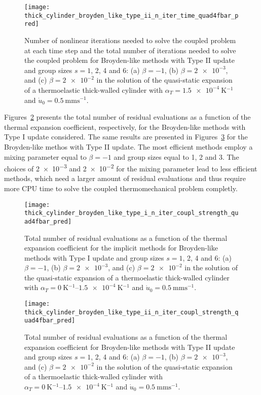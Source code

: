 \begin{figure}[htbp]
  \centering
  \texttt{[image: thick\_cylinder\_broyden\_like\_type\_ii\_n\_iter\_time\_quad4fbar\_pred]}
  \caption{Number of nonlinear iterations needed to solve the coupled problem at each time step and the total number of iterations needed to solve the coupled problem for Broyden-like methods with Type II update and group sizes \(s=1\), 2, 4 and 6: (a) \(\beta=-1\), (b) \(\beta=\num{2e-3}\), and (c) \(\beta=\num{2e-2}\) in the solution of the quasi-static expansion of a thermoelastic thick-walled cylinder with \(\alpha_T=\SI{1.5e-4}{\kelvin^{-1}}\) and \(\dot u_0 =\SI{0.5}{\milli\meter\second^{-1}}\).}
\label{fig:thick_cylinder_broyden_like_type_ii_n_iter_time_quad4fbar_pred}
\end{figure}

Figures~\ref{fig:thick_cylinder_broyden_like_type_i_n_iter_coupl_strength_quad4fbar_pred} presents the total number of residual evaluations as a function of the thermal expansion coefficient, respectively, for the Broyden-like methods with Type I update considered.
The same results are presented in Figures~\ref{fig:thick_cylinder_broyden_like_type_ii_n_iter_coupl_strength_quad4fbar_pred} for the Broyden-like methos with Type II update.
The most efficient methods employ a mixing parameter equal to \(\beta=-1\) and group sizes equal to 1, 2 and 3.
The choices of \num{2e-3} and \num{2e-2} for the mixing parameter lead to less efficient methods, which need a larger amount of residual evaluations and thus require more CPU time to solve the coupled thermomechanical problem completly.

\begin{figure}[htbp]
  \centering
  \texttt{[image: thick\_cylinder\_broyden\_like\_type\_i\_n\_iter\_coupl\_strength\_quad4fbar\_pred]}
  \caption{Total number of residual evaluations as a function of the thermal expansion coefficient for the implicit methods for Broyden-like methods with Type I update and group sizes \(s=1\), 2, 4 and 6: (a) \(\beta=-1\), (b) \(\beta=\num{2e-3}\), and (c) \(\beta=\num{2e-2}\) in the solution of the quasi-static expansion of a thermoelastic thick-walled cylinder with \(\alpha_T=\SIrange{0}{1.5e-4}{\kelvin^{-1}}\) and \(\dot u_0 =\SI{0.5}{\milli\meter\second^{-1}}\).}
\label{fig:thick_cylinder_broyden_like_type_i_n_iter_coupl_strength_quad4fbar_pred}
\end{figure}

\begin{figure}[htbp]
  \centering
  \texttt{[image: thick\_cylinder\_broyden\_like\_type\_ii\_n\_iter\_coupl\_strength\_quad4fbar\_pred]}
  \caption{Total number of residual evaluations as a function of the thermal expansion coefficient for Broyden-like methods with Type II update and group sizes \(s=1\), 2, 4 and 6: (a) \(\beta=-1\), (b) \(\beta=\num{2e-3}\), and (c) \(\beta=\num{2e-2}\) in the solution of the quasi-static expansion of a thermoelastic thick-walled cylinder with \(\alpha_T=\SIrange{0}{1.5e-4}{\kelvin^{-1}}\) and \(\dot u_0 =\SI{0.5}{\milli\meter\second^{-1}}\).}
\label{fig:thick_cylinder_broyden_like_type_ii_n_iter_coupl_strength_quad4fbar_pred}
\end{figure}

